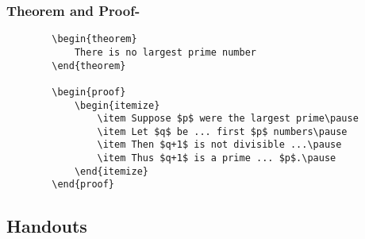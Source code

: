 \begin{frame}[fragile]
	\frametitle{Theorem and Proof-}
	\begin{verbatim}
		\begin{theorem}
			There is no largest prime number 
		\end{theorem}
		
		\begin{proof}
			\begin{itemize}
				\item Suppose $p$ were the largest prime\pause
				\item Let $q$ be ... first $p$ numbers\pause
				\item Then $q+1$ is not divisible ...\pause
				\item Thus $q+1$ is a prime ... $p$.\pause
			\end{itemize}
		\end{proof}
	\end{verbatim}
\end{frame}




\subsection{Handouts}

